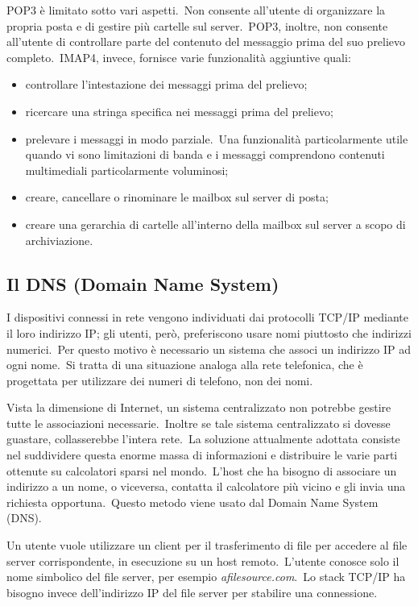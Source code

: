 POP3 è limitato sotto vari aspetti.\
Non consente all'utente di organizzare la propria posta e di gestire più cartelle sul server.\
POP3, inoltre, non consente all'utente di controllare parte del contenuto del messaggio prima del suo prelievo completo.\
IMAP4, invece, fornisce varie funzionalità aggiuntive quali:
\begin{itemize}
    \item controllare l'intestazione dei messaggi prima del prelievo;
    \item ricercare una stringa specifica nei messaggi prima del prelievo;
    \item prelevare i messaggi in modo parziale.\
          Una funzionalità particolarmente utile quando vi sono limitazioni di banda e i messaggi comprendono contenuti multimediali particolarmente voluminosi;
    \item creare, cancellare o rinominare le mailbox sul server di posta;
    \item creare una gerarchia di cartelle all'interno della mailbox sul server a scopo di archiviazione.
\end{itemize}

\subsection{Il DNS (Domain Name System)}

I dispositivi connessi in rete vengono individuati dai protocolli TCP/IP mediante il loro indirizzo IP; gli utenti, però, preferiscono usare nomi piuttosto che indirizzi numerici.\
Per questo motivo è necessario un sistema che associ un indirizzo IP ad ogni nome.\
Si tratta di una situazione analoga alla rete telefonica, che è progettata per utilizzare dei numeri di telefono, non dei nomi.

Vista la dimensione di Internet, un sistema centralizzato non potrebbe gestire tutte le associazioni necessarie.\
Inoltre se tale sistema centralizzato si dovesse guastare, collasserebbe l'intera rete.\
La soluzione attualmente adottata consiste nel suddividere questa enorme massa di informazioni e distribuire le varie parti ottenute su calcolatori sparsi nel mondo.\
L'host che ha bisogno di associare un indirizzo a un nome, o viceversa, contatta il calcolatore più vicino e gli invia una richiesta opportuna.\
Questo metodo viene usato dal Domain Name System (DNS).

Un utente vuole utilizzare un client per il trasferimento di file per accedere al file server corrispondente, in esecuzione su un host remoto.\
L'utente conosce solo il nome simbolico del file server, per esempio \emph{afilesource.com}.\
Lo stack TCP/IP ha bisogno invece dell'indirizzo IP del file server per stabilire una connessione.


